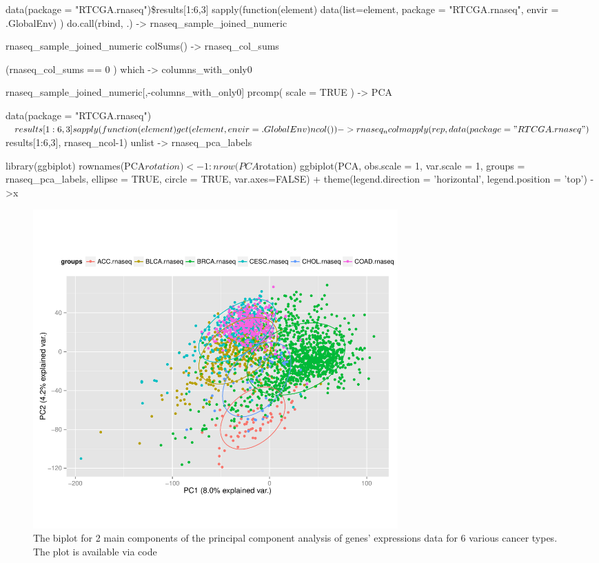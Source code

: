 \begin{Schunk} 
\begin{Sinput}
data(package = "RTCGA.rnaseq")\$results[1:6,3] %
   sapply(function(element){
      data(list=element, 
              package = "RTCGA.rnaseq",
              envir = .GlobalEnv)
   }) %
   do.call(rbind, .) -> 
   rnaseq_sample_joined_numeric

rnaseq_sample_joined_numeric %
   colSums() -> rnaseq_col_sums

(rnaseq_col_sums == 0 ) %
   which -> columns_with_only0

rnaseq_sample_joined_numeric[,-columns_with_only0] %
   prcomp( scale = TRUE ) -> PCA

data(package = "RTCGA.rnaseq")$results[1:6,3] %
   sapply(function(element){
      get(element, envir = .GlobalEnv) %
         ncol() 
   }) -> rnaseq_ncol

mapply(rep, 
       data(package = "RTCGA.rnaseq")$results[1:6,3], 
       rnaseq_ncol-1) %
   unlist -> rnaseq_pca_labels

library(ggbiplot)
rownames(PCA$rotation) <- 1:nrow(PCA$rotation)
ggbiplot(PCA, obs.scale = 1, var.scale = 1,
  groups = rnaseq_pca_labels, ellipse = TRUE, circle = TRUE, var.axes=FALSE) +
  theme(legend.direction = 'horizontal', legend.position = 'top') ->x
\end{Sinput}
\end{Schunk}

\begin{figure}[h!]
\includegraphics[width=14cm]{biplot2.pdf}
\caption{\label{biplot2}The biplot for 2 main components of the principal component analysis of genes' expressions data for 6 various cancer types. The plot is available via code }
\end{figure}

